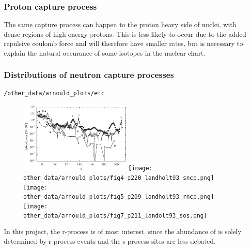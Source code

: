 \subsubsection{Proton capture process}
The same capture process can happen to the proton heavy side of nuclei, with dense regions of high energy protons. This is less likely to occur due to the added repulsive coulomb force and will therefore have smaller rates, but is necessary to explain the natural occurance of some isotopes in the nuclear chart.

\subsubsection{Distributions of neutron capture processes} \label{sec:nuclear-processes-distributions}
 \verb|/other_data/arnould_plots/etc|

\begin{figure}
  \includegraphics[width=0.5\textwidth]{other_data/arnould_plots/fig1_p100_arnould07_process_decomp.jpg}
  \texttt{[image: other\_data/arnould\_plots/fig4\_p220\_landholt93\_sncp.png]}
  \texttt{[image: other\_data/arnould\_plots/fig5\_p209\_landholt93\_rncp.png]}
  \texttt{[image: other\_data/arnould\_plots/fig7\_p211\_landolt93\_sos.png]}
\end{figure}

In this project, the r-process is of most interest, since the abundance of  is solely determined by r-process events and the s-process sites are less debated.


